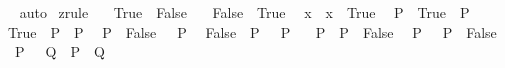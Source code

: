 \begin{isabellebody}
%
\isadelimproof
\ \ %
\endisadelimproof
%
\isatagproof
{}\isamarkupfalse%
\ auto%
\endisatagproof
{\isafoldproof}%
%
\isadelimproof
\isanewline
%
\endisadelimproof
\isanewline
{}\isamarkupfalse%
\ {\isacharbrackleft}{\kern0pt}z{}{\isacharunderscore}{\kern0pt}rule{\isacharbrackright}{\kern0pt}{\isacharcolon}{\kern0pt}\isanewline
\ \ {\isachardoublequoteopen}{\isacharparenleft}{\kern0pt}{\isasymnot}\ True{\isacharparenright}{\kern0pt}\ {\isacharequal}{\kern0pt}\ False{\isachardoublequoteclose}\isanewline
\ \ {\isachardoublequoteopen}{\isacharparenleft}{\kern0pt}{\isasymnot}\ False{\isacharparenright}{\kern0pt}\ {\isacharequal}{\kern0pt}\ True{\isachardoublequoteclose}\isanewline
\ \ {\isachardoublequoteopen}{\isacharparenleft}{\kern0pt}x\ {\isacharequal}{\kern0pt}\ x{\isacharparenright}{\kern0pt}\ {\isacharequal}{\kern0pt}\ True{\isachardoublequoteclose}\isanewline
\ \ {\isachardoublequoteopen}{\isacharparenleft}{\kern0pt}P\ {\isacharequal}{\kern0pt}\ True{\isacharparenright}{\kern0pt}\ {\isacharequal}{\kern0pt}\ P{\isachardoublequoteclose}\isanewline
\ \ {\isachardoublequoteopen}{\isacharparenleft}{\kern0pt}True\ {\isacharequal}{\kern0pt}\ P{\isacharparenright}{\kern0pt}\ {\isacharequal}{\kern0pt}\ P{\isachardoublequoteclose}\isanewline
\ \ {\isachardoublequoteopen}{\isacharparenleft}{\kern0pt}P\ {\isacharequal}{\kern0pt}\ False{\isacharparenright}{\kern0pt}\ {\isacharequal}{\kern0pt}\ {\isacharparenleft}{\kern0pt}{\isasymnot}\ P{\isacharparenright}{\kern0pt}{\isachardoublequoteclose}\isanewline
\ \ {\isachardoublequoteopen}{\isacharparenleft}{\kern0pt}False\ {\isacharequal}{\kern0pt}\ P{\isacharparenright}{\kern0pt}\ {\isacharequal}{\kern0pt}\ {\isacharparenleft}{\kern0pt}{\isasymnot}\ P{\isacharparenright}{\kern0pt}{\isachardoublequoteclose}\isanewline
\ \ {\isachardoublequoteopen}{\isacharparenleft}{\kern0pt}{\isacharparenleft}{\kern0pt}{\isasymnot}\ P{\isacharparenright}{\kern0pt}\ {\isacharequal}{\kern0pt}\ P{\isacharparenright}{\kern0pt}\ {\isacharequal}{\kern0pt}\ False{\isachardoublequoteclose}\isanewline
\ \ {\isachardoublequoteopen}{\isacharparenleft}{\kern0pt}P\ {\isacharequal}{\kern0pt}\ {\isacharparenleft}{\kern0pt}{\isasymnot}\ P{\isacharparenright}{\kern0pt}{\isacharparenright}{\kern0pt}\ {\isacharequal}{\kern0pt}\ False{\isachardoublequoteclose}\isanewline
\ \ {\isachardoublequoteopen}{\isacharparenleft}{\kern0pt}{\isacharparenleft}{\kern0pt}{\isasymnot}\ P{\isacharparenright}{\kern0pt}\ {\isacharequal}{\kern0pt}\ {\isacharparenleft}{\kern0pt}{\isasymnot}\ Q{\isacharparenright}{\kern0pt}{\isacharparenright}{\kern0pt}\ {\isacharequal}{\kern0pt}\ {\isacharparenleft}{\kern0pt}P\ {\isacharequal}{\kern0pt}\ Q{\isacharparenright}{\kern0pt}{\isachardoublequoteclose}\isanewline

\end{isabellebody}
